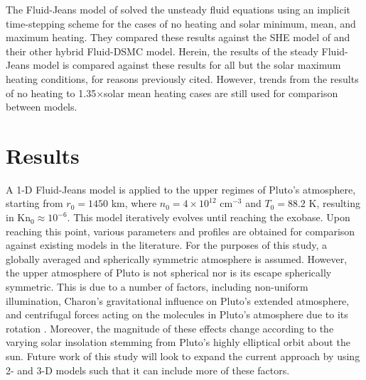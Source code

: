 \documentclass[times,12]{article}
\begin{document}
\indent The Fluid-Jeans model of \cite{Erwin2013} solved the unsteady fluid equations using an implicit time-stepping scheme for the cases of no heating and solar minimum, mean, and maximum heating. They compared these results against the SHE model of \cite{Strobel2008} and their other hybrid Fluid-DSMC model. Herein, the results of the steady Fluid-Jeans model is compared against these results for all but the solar maximum heating conditions, for reasons previously cited. However, trends from the results of no heating to 1.35$\times$solar mean heating cases are still used for comparison between models.
\section*{Results}
\noindent A 1-D Fluid-Jeans model is applied to the upper regimes of Pluto's atmosphere, starting from $r_0 = 1450$ km, where $n_0 = 4 \times 10^{12}$ cm$^{-3}$ and $T_0 = 88.2$ K, resulting in Kn$_0 \approx 10^{-6}$. This model iteratively evolves until reaching the exobase. Upon reaching this point, various parameters and profiles are obtained for comparison against existing models in the literature. For the purposes of this study, a globally averaged and spherically symmetric atmosphere is assumed. However, the upper atmosphere of Pluto is not spherical nor is its escape spherically symmetric. This is due to a number of factors, including non-uniform illumination, Charon's gravitational influence on Pluto's extended atmosphere, and centrifugal forces acting on the molecules in Pluto's atmosphere due to its rotation \citep{Tucker2015, Hoey2017}. Moreover, the magnitude of these effects change according to the varying solar insolation stemming from Pluto's highly elliptical orbit about the sun. Future work of this study will look to expand the current approach by using 2- and 3-D models such that it can include more of these factors.\\
\end{document}
